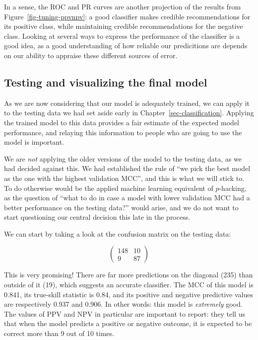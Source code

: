\documentclass[
  letterpaper,
]{scrbook}
\begin{document}
In a sense, the ROC and PR curves are another projection of the results
from Figure~\ref{fig-tuning-ppvnpv}: a good classifier makes credible
recommendations for its positive class, while maintaining credible
recommendations for the negative class. Looking at several ways to
express the performance of the classifier is a good idea, as a good
understanding of how reliable our predicitions are depends on our
ability to appraise these different sources of error.

\subsection{Testing and visualizing the final
model}\label{testing-and-visualizing-the-final-model}

As we are now considering that our model is adequately trained, we can
apply it to the testing data we had set aside early in
Chapter~\ref{sec-classification}. Applying the trained model to this
data provides a fair estimate of the expected model performance, and
relaying this information to people who are going to use the model is
important.

We are \emph{not} applying the older versions of the model to the
testing data, as we had decided against this. We had established the
rule of ``we pick the best model as the one with the highest validation
MCC'', and this is what we will stick to. To do otherwise would be the
applied machine learning equivalent of \(p\)-hacking, as the question of
``what to do in case a model with lower validation MCC had a better
performance on the testing data?'' would arise, and we do not want to
start questioning our central decision this late in the process.

We can start by taking a look at the confusion matrix on the testing
data:

\[
\begin{pmatrix}
148 & 10 \\
9 & 87
\end{pmatrix}
\]

This is very promising! There are far more predictions on the diagonal
(235) than outside of it (19), which suggests an accurate classifier.
The MCC of this model is 0.841, its true-skill statistic is 0.84, and
its positive and negative predictive values are respectively 0.937 and
0.906. In other words: this model is \emph{extremely} good. The values
of PPV and NPV in particular are important to report: they tell us that
when the model predicts a positive or negative outcome, it is expected
to be correct more than 9 out of 10 times.
\end{document}
